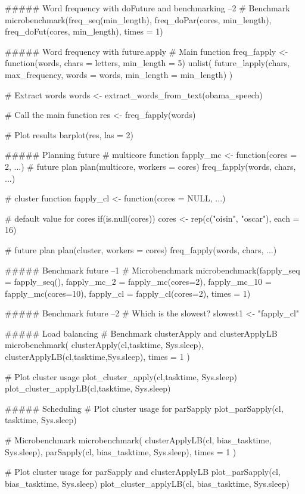 ##### Word frequency with doFuture and benchmarking  --2
# Benchmark
microbenchmark(freq_seq(min_length), 
               freq_doPar(cores, min_length), 
               freq_doFut(cores, min_length),
               times = 1)

  
  
##### Word frequency with future.apply
# Main function
freq_fapply <- function(words, chars = letters, min_length = 5) {
    unlist(
        future_lapply(chars, max_frequency, words = words, 
                         min_length = min_length)
    )
}

# Extract words
words <- extract_words_from_text(obama_speech)

# Call the main function
res <- freq_fapply(words)

# Plot results
barplot(res, las = 2)





##### Planning future
# multicore function
fapply_mc <- function(cores = 2, ...) {
    # future plan
    plan(multicore, workers = cores) 
    freq_fapply(words, chars, ...)
}

# cluster function
fapply_cl <- function(cores = NULL, ...) {
    # default value for cores
    if(is.null(cores))
        cores <- rep(c("oisin", "oscar"), each = 16)
        
    # future plan
    plan(cluster, workers = cores) 
    freq_fapply(words, chars, ...)
}



##### Benchmark future  --1
# Microbenchmark
microbenchmark(fapply_seq = fapply_seq(),
               fapply_mc_2 = fapply_mc(cores=2), 
               fapply_mc_10 = fapply_mc(cores=10),
               fapply_cl = fapply_cl(cores=2), 
               times = 1)


##### Benchmark future  --2
# Which is the slowest?
slowest1 <- "fapply_cl"



##### Load balancing
# Benchmark clusterApply and clusterApplyLB
microbenchmark(
    clusterApply(cl,tasktime, Sys.sleep),
    clusterApplyLB(cl,tasktime,Sys.sleep),
    times = 1
)

# Plot cluster usage
plot_cluster_apply(cl,tasktime, Sys.sleep)
plot_cluster_applyLB(cl,tasktime, Sys.sleep)




##### Scheduling
  # Plot cluster usage for parSapply
plot_parSapply(cl, tasktime, Sys.sleep)

# Microbenchmark
microbenchmark(
    clusterApplyLB(cl, bias_tasktime, Sys.sleep),
    parSapply(cl, bias_tasktime, Sys.sleep),
    times = 1
)

# Plot cluster usage for parSapply and clusterApplyLB
plot_parSapply(cl, bias_tasktime, Sys.sleep)
plot_cluster_applyLB(cl, bias_tasktime, Sys.sleep)


